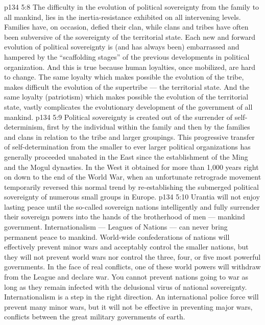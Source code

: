 \vs p134 5:8 The difficulty in the evolution of political sovereignty from the family to all mankind, lies in the inertia\hyp{}resistance exhibited on all intervening levels. Families have, on occasion, defied their clan, while clans and tribes have often been subversive of the sovereignty of the territorial state. Each new and forward evolution of political sovereignty is (and has always been) embarrassed and hampered by the “scaffolding stages” of the previous developments in political organization. And this is true because human loyalties, once mobilized, are hard to change. The same loyalty which makes possible the evolution of the tribe, makes difficult the evolution of the supertribe --- the territorial state. And the same loyalty (patriotism) which makes possible the evolution of the territorial state, vastly complicates the evolutionary development of the government of all mankind.
\vs p134 5:9 Political sovereignty is created out of the surrender of self\hyp{}determinism, first by the individual within the family and then by the families and clans in relation to the tribe and larger groupings. This progressive transfer of self\hyp{}determination from the smaller to ever larger political organizations has generally proceeded unabated in the East since the establishment of the Ming and the Mogul dynasties. In the West it obtained for more than 1,000 years right on down to the end of the World War, when an unfortunate retrograde movement temporarily reversed this normal trend by re\hyp{}establishing the submerged political sovereignty of numerous small groups in Europe.
\vs p134 5:10 Urantia will not enjoy lasting peace until the so\hyp{}called sovereign nations intelligently and fully surrender their sovereign powers into the hands of the brotherhood of men --- mankind government. Internationalism --- Leagues of Nations --- can never bring permanent peace to mankind. World\hyp{}wide confederations of nations will effectively prevent minor wars and acceptably control the smaller nations, but they will not prevent world wars nor control the three, four, or five most powerful governments. In the face of real conflicts, one of these world powers will withdraw from the League and declare war. You cannot prevent nations going to war as long as they remain infected with the delusional virus of national sovereignty. Internationalism is a step in the right direction. An international police force will prevent many minor wars, but it will not be effective in preventing major wars, conflicts between the great military governments of earth.

